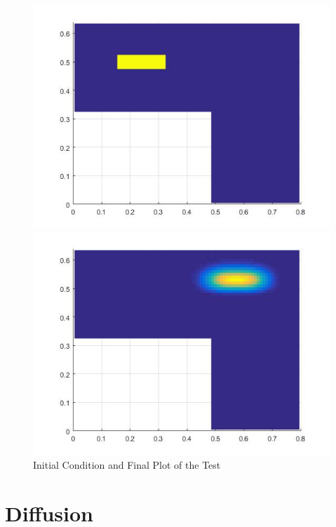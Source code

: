 \documentclass[11pt,a4paper,notitlepage]{article}
\begin{document}
\begin{figure}[h] 
\begin{minipage}{0.5\textwidth}
\includegraphics[width=1.1\linewidth]{Advec1.jpg}
\end{minipage}
\begin{minipage}{0.5\textwidth}
\includegraphics[width=1.1\linewidth]{Advec2.jpg}
\end{minipage}

\caption{Initial Condition and Final Plot of the Test}
\end{figure}


\newpage
\section{Diffusion}
\end{document}
